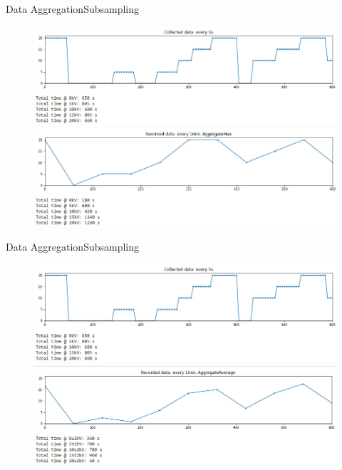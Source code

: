 \documentclass[t, 9pt, aspectratio=169]{beamer}
\begin{document}
    \begin{frame}{Data Aggregation}{Subsampling}
        \vspace{-1cm}
        \begin{figure}
            \hspace*{-1cm}\includegraphics[scale=0.5]{collected-data-5s.jpg}
            \hspace*{-1cm}\includegraphics[scale=0.5]{aggregate-max-1min.jpg}
        \end{figure}
    \end{frame}

    \begin{frame}{Data Aggregation}{Subsampling}
        \vspace{-1cm}
        \begin{figure}
            \hspace*{-1cm}\includegraphics[scale=0.5]{collected-data-5s.jpg}
            \hspace*{-1cm}\includegraphics[scale=0.5]{aggregate-avg-1min.jpg}
        \end{figure}
    \end{frame}
\end{document}
